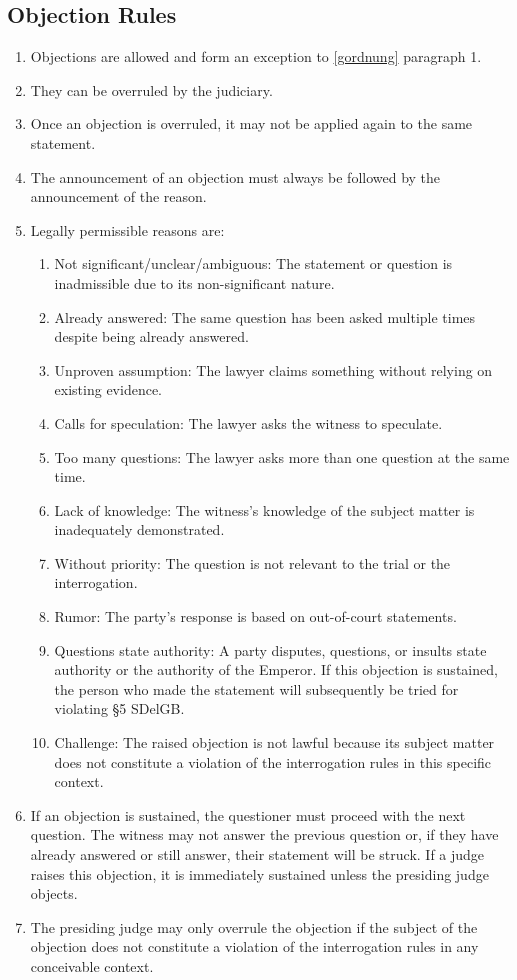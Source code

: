 \documentclass{article}
\begin{document}
\subsection{Objection Rules}\label{eordnung}
\begin{enumerate}[(1)]
    \item Objections are allowed and form an exception to \ref{gordnung} paragraph 1.
    \item They can be overruled by the judiciary.
    \item Once an objection is overruled, it may not be applied again to the same statement.
    \item The announcement of an objection must always be followed by the announcement of the reason.
    \item Legally permissible reasons are:
        \begin{enumerate}[1.]
            \item Not significant/unclear/ambiguous: The statement or question is inadmissible due to its non-significant nature.
            \item Already answered: The same question has been asked multiple times despite being already answered.
            \item Unproven assumption: The lawyer claims something without relying on existing evidence.
            \item Calls for speculation: The lawyer asks the witness to speculate.
            \item Too many questions: The lawyer asks more than one question at the same time.
            \item Lack of knowledge: The witness's knowledge of the subject matter is inadequately demonstrated.
            \item Without priority: The question is not relevant to the trial or the interrogation.
            \item Rumor: The party's response is based on out-of-court statements.
            \item Questions state authority: A party disputes, questions, or insults state authority or the authority of the Emperor. If this objection is sustained, the person who made the statement will subsequently be tried for violating §5 SDelGB.
            \item Challenge: The raised objection is not lawful because its subject matter does not constitute a violation of the interrogation rules in this specific context.
        \end{enumerate}
    \item If an objection is sustained, the questioner must proceed with the next question. The witness may not answer the previous question or, if they have already answered or still answer, their statement will be struck. If a judge raises this objection, it is immediately sustained unless the presiding judge objects.
    \item The presiding judge may only overrule the objection if the subject of the objection does not constitute a violation of the interrogation rules in any conceivable context.
\end{enumerate}
\end{document}
